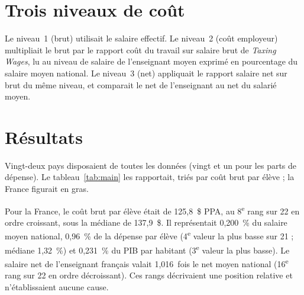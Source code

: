 \documentclass[11pt,a4paper]{article}
\begin{document}
\section{Trois niveaux de coût}
Le niveau~1 (brut) utilisait le salaire effectif. Le niveau~2 (coût employeur) multipliait le brut par le rapport coût du travail sur salaire brut de \emph{Taxing Wages}, lu au niveau de salaire de l'enseignant moyen exprimé en pourcentage du salaire moyen national. Le niveau~3 (net) appliquait le rapport salaire net sur brut du même niveau, et comparait le net de l'enseignant au net du salarié moyen.

\section{Résultats}
Vingt-deux pays disposaient de toutes les données (vingt et un pour les parts de dépense). Le tableau~\ref{tab:main} les rapportait, triés par coût brut par élève ; la France figurait en gras.

\begin{table}[ht]
\centering\footnotesize\setlength{\tabcolsep}{3.5pt}

\caption{Coût d'une heure hebdomadaire supplémentaire par classe. Dollars PPA en prix constants. «~\% sal.\ moyen~» : salaire de l'enseignant en pourcentage du salaire moyen national. «~\% dép.\ par élève~» et «~\% PIB/hab.~» : coût brut par élève rapporté à la dépense par élève et au PIB par habitant. «~\% sal.\ nat.~» : coût brut par élève en pourcentage du salaire moyen national annuel.}\label{tab:main}
\end{table}

Pour la France, le coût brut par élève était de 125,8~\$ PPA, au 8\textsuperscript{e} rang sur 22 en ordre croissant, sous la médiane de 137,9~\$. Il représentait 0,200~\% du salaire moyen national, 0,96~\% de la dépense par élève (4\textsuperscript{e} valeur la plus basse sur 21 ; médiane 1,32~\%) et 0,231~\% du PIB par habitant (3\textsuperscript{e} valeur la plus basse). Le salaire net de l'enseignant français valait 1,016~fois le net moyen national (16\textsuperscript{e} rang sur 22 en ordre décroissant). Ces rangs décrivaient une position relative et n'établissaient aucune cause.
\end{document}
